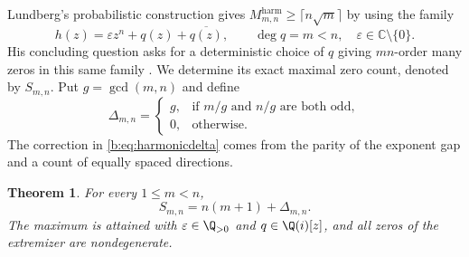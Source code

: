 \documentclass[UTF8,11pt]{ctexart}
\newtheorem{thm}{Theorem}[section]
\theoremstyle{definition}
\numberwithin{equation}{section}
\newcommand{\C}{\mathbb C}\newcommand{\R}{\mathbb R}
\begin{document}
Lundberg's probabilistic construction gives
$M^{\mathrm{harm}}_{m,n}\ge\lceil n\sqrt m\rceil$ by using the family
\begin{equation}\label{b:eq:harmonicfamily}
 h(z)=\varepsilon z^n+q(z)+\overline{q(z)},\qquad
 \deg q=m<n,\quad \varepsilon\in\C\setminus\{0\}.
\end{equation}
His concluding question asks for a deterministic choice of $q$ giving
$mn$-order many zeros in this same family
\cite[Section~4.2, \av, p.~9]{Lun23}.
We determine its exact maximal zero count, denoted by $S_{m,n}$.
Put $g=\gcd(m,n)$ and define
\begin{equation}\label{b:eq:harmonicdelta}
 \Delta_{m,n}=
 \begin{cases}
  g,&\text{if $m/g$ and $n/g$ are both odd},\\
  0,&\text{otherwise}.
 \end{cases}
\end{equation}
The correction in \eqref{b:eq:harmonicdelta} comes from the parity of
the exponent gap and a count of equally spaced directions.
\begin{thm}\label{b:thm:harmonic}
For every $1\le m<n$,
\begin{equation}\label{b:eq:harmonicexact}
 S_{m,n}=n(m+1)+\Delta_{m,n}.
\end{equation}
The maximum is attained with $\varepsilon\in\Q_{>0}$ and
$q\in\Q(i)[z]$, and all zeros of the extremizer are nondegenerate.
\end{thm}
\end{document}
